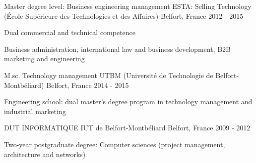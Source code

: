 

\begin{cventries}
\cventry
	{Master degree level: Business engineering management} %
	{ESTA: Selling Technology (École Supérieure des Technologies et des Affaires)} %
	{Belfort, France} %
	{2012 - 2015} %
	{
		\begin{cvitems} %
			\item {Dual commercial and technical competence}
			\item {Business administration, international law and business development, B2B marketing and engineering}
		\end{cvitems}
	}

  \cventry
    {M.sc. Technology management} %
    {UTBM (Université de Technologie de Belfort-Montbéliard)} %
    {Belfort, France} %
    {2014 - 2015} %
    {
      \begin{cvitems} %
        \item {Engineering school: dual master’s degree program in technology management and industrial marketing}
      \end{cvitems}
    }
    


  \cventry
    {DUT INFORMATIQUE} %
    {IUT de Belfort-Montbéliard} %
    {Belfort, France} %
    {2009 - 2012} %
    {
      \begin{cvitems} %
        \item {Two-year postgraduate degree: Computer sciences (project management, architecture and networks)}
      \end{cvitems}
    }


\end{cventries}
